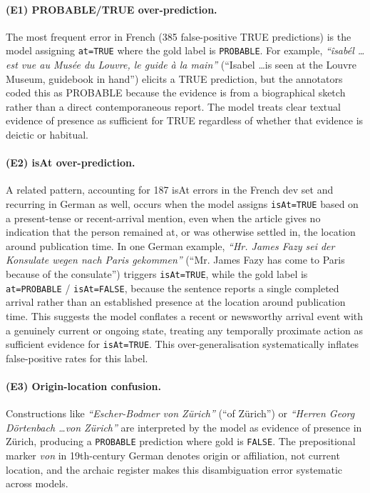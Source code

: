 \documentclass[
]{ceurart}
\theoremstyle{definition}
\begin{document}
\paragraph{(E1) PROBABLE/TRUE over-prediction.}
The most frequent error in French (385 false-positive TRUE predictions) is the model assigning \texttt{at=TRUE} where the gold label is \texttt{PROBABLE}.
For example, \textit{``îsabél \ldots est vue au Musée du Louvre, le guide à la main''} (``Isabel \ldots is seen at the Louvre Museum, guidebook in hand'') elicits a TRUE prediction, but the annotators coded this as PROBABLE because the evidence is from a biographical sketch rather than a direct contemporaneous report.
The model treats clear textual evidence of presence as sufficient for TRUE regardless of whether that evidence is deictic or habitual.

\paragraph{(E2) isAt over-prediction.}
A related pattern, accounting for 187 isAt errors in the French dev set and recurring in German as well, occurs when the model assigns \texttt{isAt=TRUE} based on a present-tense or recent-arrival mention, even when the article gives no indication that the person remained at, or was otherwise settled in, the location around publication time.
In one German example, \textit{``Hr. James Fazy sei der Konsulate wegen nach Paris gekommen''} (``Mr. James Fazy has come to Paris because of the consulate'') triggers \texttt{isAt=TRUE}, while the gold label is \texttt{at=PROBABLE} / \texttt{isAt=FALSE}, because the sentence reports a single completed arrival rather than an established presence at the location around publication time.
This suggests the model conflates a recent or newsworthy arrival event with a genuinely current or ongoing state, treating any temporally proximate action as sufficient evidence for \texttt{isAt=TRUE}.
This over-generalisation systematically inflates false-positive rates for this label.

\paragraph{(E3) Origin-location confusion.}
Constructions like \textit{``Escher-Bodmer von Zürich''} (``of Zürich'') or \textit{``Herren Georg Dörtenbach \ldots von Zürich''} are interpreted by the model as evidence of presence in Zürich, producing a \texttt{PROBABLE} prediction where gold is \texttt{FALSE}.
The prepositional marker \textit{von} in 19th-century German denotes origin or affiliation, not current location, and the archaic register makes this disambiguation error systematic across models.
\end{document}
